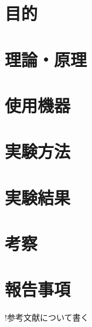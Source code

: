 \documentclass[a4j]{jarticle}
\begin{document}
    \section{目的}
    \section{理論・原理}
    \section{使用機器}
    \section{実験方法}
    \section{実験結果}
    \section{考察}
    \section{報告事項}
    !参考文献について書く
\end{document}
